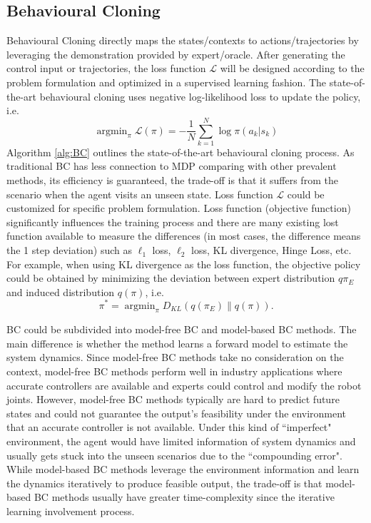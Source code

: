 \documentclass[acmsmall]{acmart}
\DeclareMathOperator*{\argmin}{argmin}
\begin{document}
\subsection{Behavioural Cloning} 
Behavioural Cloning directly maps the states/contexts to actions/trajectories by leveraging the demonstration provided by expert/oracle. After generating the control input or trajectories, the loss function $\mathcal{L}$ will be designed according to the problem formulation and optimized in a supervised learning fashion. The state-of-the-art behavioural cloning uses negative log-likelihood loss to update the policy, i.e.
\[
\argmin_{\pi}\mathcal{L}(\pi)=-\frac{1}{N}\sum_{k=1}^{N}\log \pi(a_{k}|s_{k})
\]
Algorithm \ref{alg:BC} outlines the state-of-the-art behavioural cloning process. As traditional BC has less connection to MDP comparing with other prevalent methods, its efficiency is guaranteed, the trade-off is that it suffers from the scenario when the agent visits an unseen state.
Loss function $\mathcal{L}$ could be customized for specific problem formulation. Loss function (objective function) significantly influences the training process and there are many existing lost function available to measure the differences (in most cases, the difference means the 1 step deviation) such as $\ell_1$ loss, $\ell_2$ loss, KL divergence, Hinge Loss, etc.
For example, when using KL divergence as the loss function, the objective policy could be obtained by minimizing the deviation between expert distribution $q{\pi_{E}}$ and induced distribution $q(\pi)$, i.e.
\[
\pi^{*}=\argmin_{\pi}D_{KL}(q(\pi_{E})\|q(\pi)).
\]

BC could be subdivided into model-free BC and model-based BC methods. The main difference is whether the method learns a forward model to estimate the system dynamics. Since model-free BC methods take no consideration on the context, model-free BC methods perform well in industry applications where accurate controllers are available and experts could control and modify the robot joints. However, model-free BC methods typically are hard to predict future states and could not guarantee the output's feasibility under the environment that an accurate controller is not available. Under this kind of ``imperfect" environment, the agent would have limited information of system dynamics and usually gets stuck into the unseen scenarios due to the ``compounding error"\cite{rossEfficientReductionsImitation2010}. While model-based BC methods leverage the environment information and learn the dynamics iteratively to produce feasible output, the trade-off is that model-based BC methods usually have greater time-complexity since the iterative learning involvement process.
\end{document}
